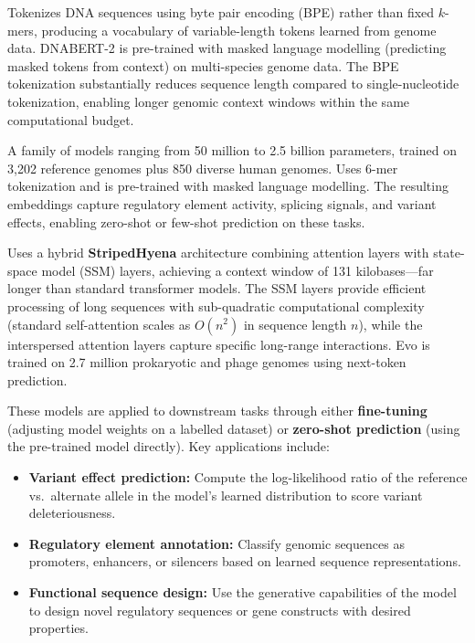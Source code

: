 \begin{description}[style=nextline, itemsep=3pt]
  \item[DNABERT-2] Tokenizes DNA sequences using byte pair encoding (BPE) rather than fixed $k$-mers, producing a vocabulary of variable-length tokens learned from genome data. DNABERT-2 is pre-trained with masked language modelling (predicting masked tokens from context) on multi-species genome data. The BPE tokenization substantially reduces sequence length compared to single-nucleotide tokenization, enabling longer genomic context windows within the same computational budget.

  \item[Nucleotide Transformer] A family of models ranging from 50 million to 2.5 billion parameters, trained on 3,202 reference genomes plus 850 diverse human genomes. Uses 6-mer tokenization and is pre-trained with masked language modelling. The resulting embeddings capture regulatory element activity, splicing signals, and variant effects, enabling zero-shot or few-shot prediction on these tasks.

  \item[Evo] Uses a hybrid \textbf{StripedHyena} architecture combining attention layers with state-space model (SSM) layers, achieving a context window of 131 kilobases---far longer than standard transformer models. The SSM layers provide efficient processing of long sequences with sub-quadratic computational complexity (standard self-attention scales as $O(n^2)$ in sequence length $n$), while the interspersed attention layers capture specific long-range interactions. Evo is trained on 2.7 million prokaryotic and phage genomes using next-token prediction.
\end{description}

These models are applied to downstream tasks through either \textbf{fine-tuning} (adjusting model weights on a labelled dataset) or \textbf{zero-shot prediction} (using the pre-trained model directly). Key applications include:
\begin{itemize}[itemsep=2pt]
  \item \textbf{Variant effect prediction:} Compute the log-likelihood ratio of the reference vs.\ alternate allele in the model's learned distribution to score variant deleteriousness.
  \item \textbf{Regulatory element annotation:} Classify genomic sequences as promoters, enhancers, or silencers based on learned sequence representations.
  \item \textbf{Functional sequence design:} Use the generative capabilities of the model to design novel regulatory sequences or gene constructs with desired properties.
\end{itemize}

